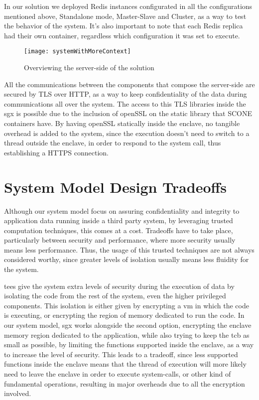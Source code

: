 In our solution we deployed Redis instances configurated in all the configurations mentioned above, Standalone mode, Master-Slave and Cluster, as a way to test the behavior of the system. It's also important to note that each Redis replica had their own container, regardless which configuration it was set to execute. 



\begin{figure}[htbp]
	\centering
	{\texttt{[image: systemWithMoreContext]}}
	\caption{Overviewing the server-side of the solution}
	\label{fig:serverside_systemModel}
\end{figure}

All the communications between the components that compose the server-side are secured by TLS over HTTP, as a way to keep confidentiality of the data during communications all over the system. The access to this TLS libraries inside the \gls{sgx} is possible due to the inclusion of openSSL on the static library that SCONE containers have. By having openSSL statically inside the enclave, no tangible overhead is added to the system, since the execution doesn't need to switch to a thread outside the enclave, in order to respond to the system call, thus establishing a HTTPS connection. 

  
\section{System Model Design Tradeoffs}

Although our system model focus on assuring confidentiality and integrity to application data running inside a third party system, by leveraging trusted computation techniques, this comes at a cost. Tradeoffs have to take place, particularly between security and performance, where more security usually means less performance. 
Thus, the usage of this trusted techniques are not always considered worthy, since greater levels of isolation usually means less fluidity for the system.  

\gls{tee}s give the system extra levels of security during the execution of data by isolating the code from the rest of the system, even the higher privileged components. This isolation is either given by encrypting a \gls{vm} in which the code is executing, or encrypting the region of memory dedicated to run the code. 
In our system model, \gls{sgx} works alongside the second option, encrypting the enclave memory region dedicated to the application, while also trying to keep the \gls{tcb} as small as possible, by limiting the functions supported inside the enclave, as a way to increase the level of security. 
This leads to a tradeoff, since less supported functions inside the enclave means that the thread of execution will more likely need to leave the enclave in order to execute system-calls, or other kind of fundamental operations, resulting in major overheads due to all the encryption involved. 


